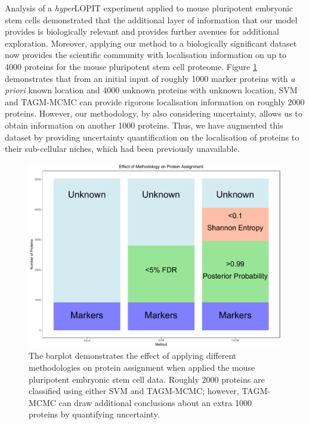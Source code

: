 \documentclass[12pt,english]{article}\usepackage[]{graphicx}\usepackage[]{color}
\begin{document}
Analysis of a \textit{hyper}LOPIT experiment applied to mouse
pluripotent embryonic stem cells demonstrated that the additional
layer of information that our model provides is biologically relevant
and provides further avenues for additional exploration. Moreover,
applying our method to a biologically significant dataset now provides
the scientific community with localisation information on up to 4000
proteins for the mouse pluripotent stem cell proteome. Figure
\ref{figure:ConcludePlot} demonstrates that from an initial input of
roughly 1000 marker proteins with \textit{a priori} known location and
4000 unknown proteins with unknown location, SVM and TAGM-MCMC can
provide rigorous localisation information on roughly 2000
proteins. However, our methodology, by also considering uncertainty,
allows us to obtain information on another 1000 proteins. Thus, we
have augmented this dataset by providing uncertainty quantification on
the localisation of proteins to their sub-cellular niches, which had
been previously unavailable.
{}

\begin{figure}[h]

\centering
\includegraphics[width=.7\textwidth]{ConcludePlot.pdf}
\caption{The barplot demonstrates the effect of applying different
  methodologies on protein assignment when applied the mouse
  pluripotent embryonic stem cell data. Roughly 2000 proteins are
  classified using either SVM and TAGM-MCMC; however, TAGM-MCMC can
  draw additional conclusions about an extra 1000 proteins by
  quantifying uncertainty.}
\label{figure:ConcludePlot}
\end{figure}
\end{document}

